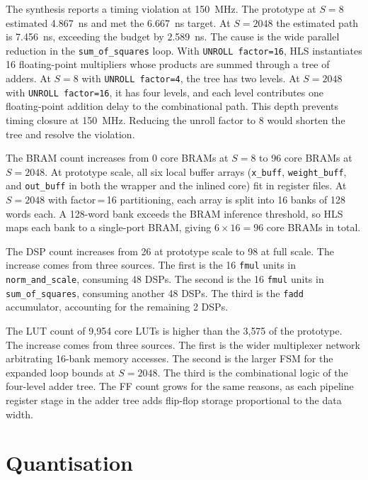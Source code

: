 The synthesis reports a timing violation at \SI{150}{\mega\hertz}. The
prototype at $S = 8$ estimated \SI{4.867}{\nano\second} and met the
\SI{6.667}{\nano\second} target. At $S = 2048$ the estimated path is
\SI{7.456}{\nano\second}, exceeding the budget by \SI{2.589}{\nano\second}.
The cause is the wide parallel reduction in the \texttt{sum\_of\_squares} loop.
With \texttt{UNROLL factor=16}, HLS instantiates 16 floating-point
multipliers whose products are summed through a tree of adders. At $S = 8$
with \texttt{UNROLL factor=4}, the tree has two levels. At $S = 2048$
with \texttt{UNROLL factor=16}, it has four levels, and each level
contributes one floating-point addition delay to the combinational path.
This depth prevents timing closure at \SI{150}{\mega\hertz}. Reducing the
unroll factor to 8 would shorten the tree and
resolve the violation.


The BRAM count increases from 0 core BRAMs at $S = 8$ to 96 core BRAMs
at $S = 2048$. At prototype scale, all six local buffer arrays
(\texttt{x\_buff}, \texttt{weight\_buff}, and \texttt{out\_buff} in both
the wrapper and the inlined core) fit in register files. At $S = 2048$
with factor\,=\,16 partitioning, each array is split into 16 banks of
128 words each. A 128-word bank exceeds the BRAM inference threshold, so
HLS maps each bank to a single-port BRAM, giving $6 \times 16 = 96$ core
BRAMs in total.

The DSP count increases from 26 at prototype scale to 98 at full scale.
The increase comes from three sources. The first is the 16 \texttt{fmul}
units in \texttt{norm\_and\_scale}, consuming 48 DSPs. The second is the
16 \texttt{fmul} units in \texttt{sum\_of\_squares}, consuming another
48 DSPs. The third is the \texttt{fadd} accumulator, accounting for the
remaining 2 DSPs.

The LUT count of 9{,}954 core LUTs is higher than the 3{,}575 of the
prototype. The increase comes from three sources. The first is the wider multiplexer
network arbitrating 16-bank memory accesses. The second is the larger FSM
for the expanded loop bounds at $S = 2048$. The third is the combinational
logic of the
four-level adder tree. The FF count grows for the same reasons, as each
pipeline register stage in the adder tree adds flip-flop storage
proportional to the data width.



\section{Quantisation}
\label{sec:quantize_impl}

